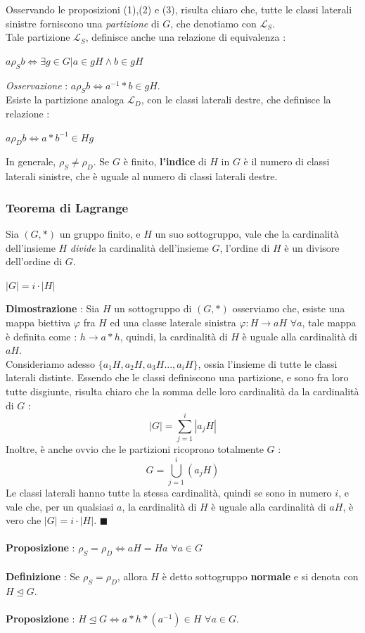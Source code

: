 \documentclass[12pt, letterpaper]{article}
\begin{document}
Osservando le proposizioni (1),(2) e (3), risulta chiaro che, tutte le classi laterali sinistre  
forniscono una \textit{partizione} di \(G\), che denotiamo con \(\mathcal{L}_S\).\\
Tale partizione \(\mathcal{L}_S\), definisce anche una relazione di equivalenza : \begin{center}
    \(a\rho_S b\iff \exists g\in G |a\in gH \land b\in gH\)
\end{center}
\textit{Osservazione }:  \(a\rho_S b\iff a^{-1}*b\in gH\). 
\\Esiste la partizione analoga \(\mathcal{L}_D\), con le classi laterali destre, che definisce la relazione :
\begin{center}
    \(a\rho_D b\iff a*b^{-1}\in Hg\)
\end{center}
In generale, \(\rho_S\ne \rho_D\).
Se \(G\) è finito, \textbf{l'indice} di \(H\) in \(G\) è il numero di classi laterali sinistre, che è uguale 
al numero di classi laterali destre.
\subsubsection{Teorema di Lagrange}
Sia \((G,*)\) un gruppo finito, e \(H\) un suo sottogruppo, vale che la cardinalità dell'insieme \(H\) \textit{divide}
la cardinalità dell'insieme \(G\), l'ordine di \(H\) è un divisore dell'ordine di \(G\).\begin{center}
    \(|G|=i\cdot|H|\)
\end{center} 
\textbf{Dimostrazione }: Sia \(H\) un sottogruppo di \((G,*)\) osserviamo che, esiste una mappa biettiva \(\varphi\) 
fra \(H\) ed una classe laterale sinistra \(\varphi:H\rightarrow aH\) \(\forall a\), tale mappa è definita 
come : \(h\rightarrow a*h\), quindi, la cardinalità di \(H\) è uguale alla cardinalità di \(aH\).
\\Consideriamo adesso \(\{a_1H,a_2H,a_3H...,a_iH\}\), ossia l'insieme di tutte le classi 
laterali distinte. Essendo che le classi definiscono una partizione, e sono fra loro tutte disgiunte, 
risulta chiaro che la somma delle loro cardinalità da la cardinalità di \(G\) : \begin{equation}
    |G|=\sum_{j=1}^i|a_jH|
\end{equation}
Inoltre, è anche ovvio che le partizioni ricoprono totalmente \(G\) :
\begin{equation}
    G=\bigcup_{j=1}^i (a_jH)
\end{equation}
Le classi laterali hanno tutte la stessa cardinalità, quindi se sono in numero \(i\), e vale che, per un 
qualsiasi \(a\), la cardinalità di \(H\) è uguale alla cardinalità di \(aH\), è vero che \(|G|=i\cdot|H|\). \(\blacksquare\)
\\\hphantom{}\\
\textbf{Proposizione }: \(\rho_S=\rho_D \iff aH=Ha\)  \(\forall a\in G\)
\\\hphantom{}\\
\textbf{Definizione }: Se \(\rho_S=\rho_D\), allora \(H\) è detto sottogruppo \textbf{normale} e si denota con \(H\unlhd G\).
\\\hphantom{}\\
\textbf{Proposizione }: \(H\unlhd G\iff a*h*(a^{-1})\in H \)  \(\forall a\in G\).
\end{document}
